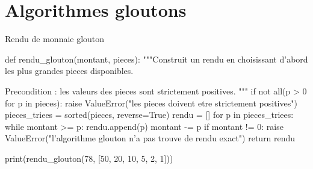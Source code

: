 \section{Algorithmes gloutons}



\begin{codereference}{Rendu de monnaie glouton}
\begin{python}
def rendu_glouton(montant, pieces):
    """Construit un rendu en choisissant d'abord les plus grandes pieces disponibles.

    Precondition : les valeurs des pieces sont strictement positives.
    """
    if not all(p > 0 for p in pieces):
        raise ValueError("les pieces doivent etre strictement positives")
    pieces_triees = sorted(pieces, reverse=True)
    rendu = []
    for p in pieces_triees:
        while montant >= p:
            rendu.append(p)
            montant -= p
    if montant != 0:
        raise ValueError("l'algorithme glouton n'a pas trouve de rendu exact")
    return rendu


print(rendu_glouton(78, [50, 20, 10, 5, 2, 1]))
\end{python}
\end{codereference}


